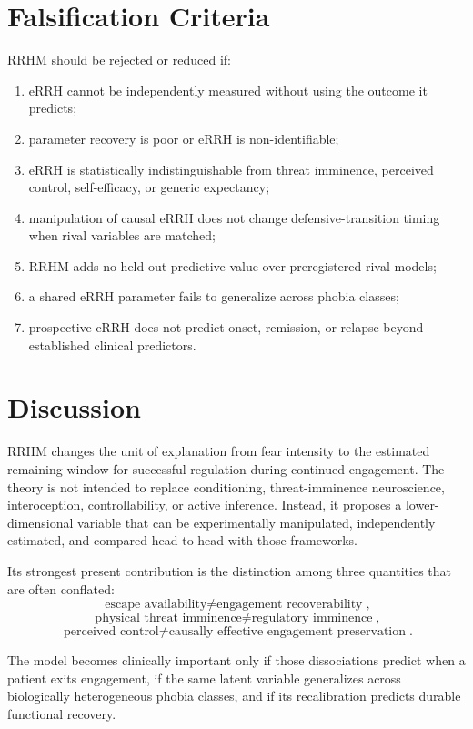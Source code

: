 \documentclass[11pt]{article}
\begin{document}
\section{Falsification Criteria}
RRHM should be rejected or reduced if:
\begin{enumerate}[leftmargin=2em]
\item eRRH cannot be independently measured without using the outcome it predicts;
\item parameter recovery is poor or eRRH is non-identifiable;
\item eRRH is statistically indistinguishable from threat imminence, perceived control, self-efficacy, or generic expectancy;
\item manipulation of causal eRRH does not change defensive-transition timing when rival variables are matched;
\item RRHM adds no held-out predictive value over preregistered rival models;
\item a shared eRRH parameter fails to generalize across phobia classes;
\item prospective eRRH does not predict onset, remission, or relapse beyond established clinical predictors.
\end{enumerate}

\section{Discussion}
RRHM changes the unit of explanation from fear intensity to the estimated remaining window for successful regulation during continued engagement. The theory is not intended to replace conditioning, threat-imminence neuroscience, interoception, controllability, or active inference. Instead, it proposes a lower-dimensional variable that can be experimentally manipulated, independently estimated, and compared head-to-head with those frameworks.

Its strongest present contribution is the distinction among three quantities that are often conflated:
\[
\boxed{\text{escape availability}\neq\text{engagement recoverability}},
\]
\[
\boxed{\text{physical threat imminence}\neq\text{regulatory imminence}},
\]
\[
\boxed{\text{perceived control}\neq\text{causally effective engagement preservation}}.
\]

The model becomes clinically important only if those dissociations predict when a patient exits engagement, if the same latent variable generalizes across biologically heterogeneous phobia classes, and if its recalibration predicts durable functional recovery.
\end{document}
